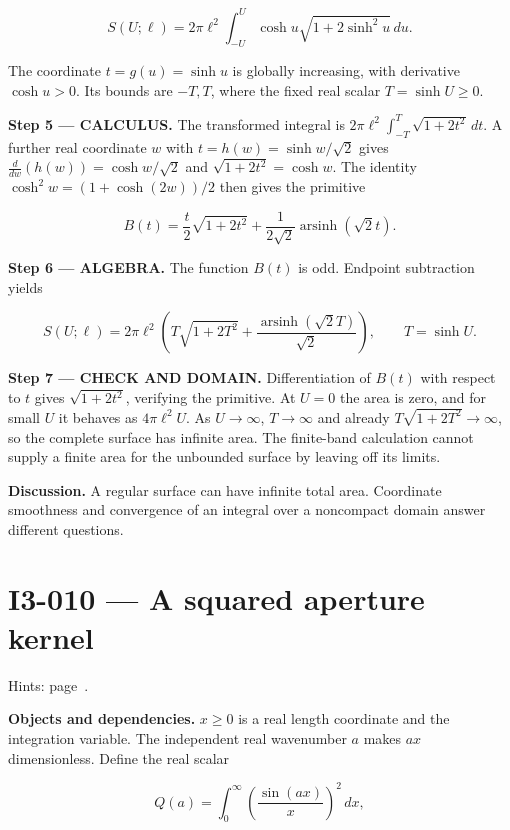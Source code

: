 \documentclass[11pt,oneside,openany]{book}
\begin{document}
\[
S(U;\ell)=2\pi\ell^2\int_{-U}^U\cosh u\sqrt{1+2\sinh^2u}\,du.
\]

The coordinate \(t=g(u)=\sinh u\) is globally increasing, with derivative \(\cosh u>0\). Its bounds are \(-T,T\), where the fixed real scalar \(T=\sinh U\ge0\).

\endgroup
\textbf{Step 5 --- CALCULUS.} The transformed integral is \(2\pi\ell^2\int_{-T}^T\sqrt{1+2t^2}\,dt\). A further real coordinate \(w\) with \(t=h(w)=\sinh w/\sqrt2\) gives \(\frac{d}{dw}\left(h(w)\right)=\cosh w/\sqrt2\) and \(\sqrt{1+2t^2}=\cosh w\). The identity \(\cosh^2w=(1+\cosh(2w))/2\) then gives the primitive

\[
B(t)=\frac{t}{2}\sqrt{1+2t^2}+\frac{1}{2\sqrt2}\operatorname{arsinh}(\sqrt2t).
\]

\begingroup\color{AlgebraBlue}
\textbf{Step 6 --- ALGEBRA.} The function \(B(t)\) is odd. Endpoint subtraction yields

\[
S(U;\ell)=2\pi\ell^2\left(T\sqrt{1+2T^2}+\frac{\operatorname{arsinh}(\sqrt2T)}{\sqrt2}\right),\qquad T=\sinh U.
\]

\endgroup
\begin{DomainStep}
\textbf{Step 7 --- CHECK AND DOMAIN.} Differentiation of \(B(t)\) with respect to \(t\) gives \(\sqrt{1+2t^2}\), verifying the primitive. At \(U=0\) the area is zero, and for small \(U\) it behaves as \(4\pi\ell^2U\). As \(U\to\infty\), \(T\to\infty\) and already \(T\sqrt{1+2T^2}\to\infty\), so the complete surface has infinite area. The finite-band calculation cannot supply a finite area for the unbounded surface by leaving off its limits.

\end{DomainStep}
\textbf{Discussion.} A regular surface can have infinite total area. Coordinate smoothness and convergence of an integral over a noncompact domain answer different questions.
\clearpage
\section{I3-010 --- A squared aperture kernel}
\label{problem:I3-010}
{\small Hints: page~\pageref{hints:I3-010}.}\par\medskip

\textbf{Objects and dependencies.} \(x\ge0\) is a real length coordinate and the integration variable. The independent real wavenumber \(a\) makes \(ax\) dimensionless. Define the real scalar

\[
Q(a)=\int_0^\infty\left(\frac{\sin(ax)}{x}\right)^2\,dx,
\]
\end{document}

